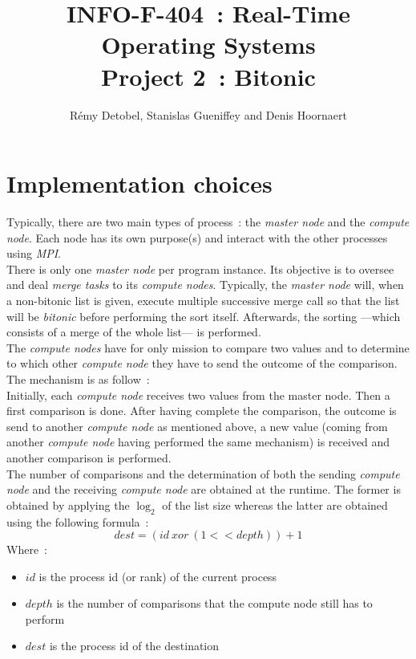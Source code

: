 \documentclass[a4paper,11pt]{article}
\title{INFO-F-404~: Real-Time Operating Systems\\Project 2~: Bitonic}
\author{Rémy Detobel, Stanislas Gueniffey and Denis Hoornaert}
\begin{document}
\maketitle

\section{Implementation choices}

  Typically, there are two main types of process~: the \textit{master node} and the \textit{compute node}. Each node has its own purpose(s) and interact with the other processes using \textit{MPI}.\\
  
  \noindent There is only one \textit{master node} per program instance. Its objective is to oversee and deal \textit{merge tasks} to its \textit{compute nodes}. Typically, the \textit{master node} will, when a non-bitonic list is given, execute multiple successive merge call so that the list will be \textit{bitonic} before performing the sort itself. Afterwards, the sorting  ---which consists of a merge of the whole list--- is performed.\\
  
  \noindent The \textit{compute nodes} have for only mission to compare two values and to determine to which other \textit{compute node} they have to send the outcome of the comparison. The mechanism is as follow~:\\
  Initially, each \textit{compute node} receives two values from the master node. Then a first comparison is done. After having complete the comparison, the outcome is send to another \textit{compute node} as mentioned above, a new value (coming from another \textit{compute node} having performed the same mechanism) is received and another comparison is performed.\\
  The number of comparisons and the determination of both the sending \textit{compute node} and the receiving \textit{compute node} are obtained at the runtime. The former is obtained by applying the $\log_{2}$ of the list size whereas the latter are obtained using the following formula~:
  \[dest = (id~xor~(1 << depth)) + 1\]
  Where~:
  \begin{itemize}
    \item $id$ is the process id (or rank) of the current process
    \item $depth$ is the number of comparisons that the compute node still has to perform
    \item $dest$ is the process id of the destination
  \end{itemize}
\end{document}
